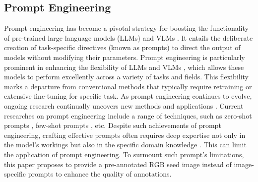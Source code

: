 \subsection{Prompt Engineering}
\vspace{-0.1cm}
Prompt engineering \cite{tonmoy2024comprehensive} has become a pivotal strategy for boosting the functionality of pre-trained large language models (LLMs) \cite{10265134} and VLMs \cite{10611726}. It entails the deliberate creation of task-specific directives (known as prompts) to direct the output of models without modifying their parameters. Prompt engineering is particularly prominent in enhancing the flexibility of LLMs and VLMs \cite{10610948}, which allows these models to perform excellently across a variety of tasks and fields. This flexibility marks a departure from conventional methods that typically require retraining or extensive fine-tuning for specific task. As prompt engineering continues to evolve, ongoing research continually uncovers new methods \cite{zhang2024extracting} and applications \cite{xiao2024efficient}. Current researches on prompt engineering include a range of techniques, such as zero-shot prompts \cite{allingham2023simple}, few-shot prompts \cite{lu2021fantastically}, etc. Despite such achievements of prompt engineering, crafting effective prompts often requires deep expertise not only in the model's workings but also in the specific domain knowledge \cite{liu2022design}. This can limit the application of prompt engineering. To surmount such prompt's limitations, this paper proposes to provide a pre-annotated RGB seed image instead of image-specific prompts to enhance the quality of annotations.